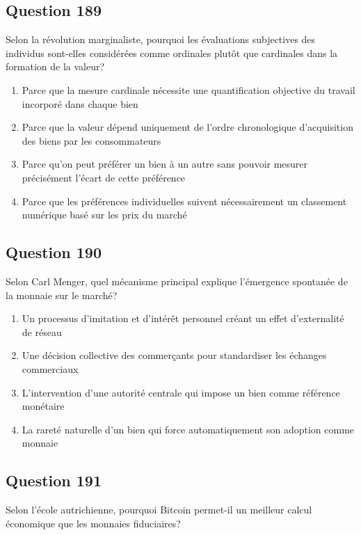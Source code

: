 \documentclass[12pt,a4paper]{article}
\begin{document}
\bigskip


\subsection*{Question 189}
Selon la révolution marginaliste, pourquoi les évaluations subjectives des individus sont-elles considérées comme ordinales plutôt que cardinales dans la formation de la valeur?

\begin{enumerate}[label=\Alph*., leftmargin=*]
\item Parce que la mesure cardinale nécessite une quantification objective du travail incorporé dans chaque bien
\item Parce que la valeur dépend uniquement de l'ordre chronologique d'acquisition des biens par les consommateurs
\item Parce qu'on peut préférer un bien à un autre sans pouvoir mesurer précisément l'écart de cette préférence
\item Parce que les préférences individuelles suivent nécessairement un classement numérique basé sur les prix du marché
\end{enumerate}

\bigskip


\subsection*{Question 190}
Selon Carl Menger, quel mécanisme principal explique l'émergence spontanée de la monnaie sur le marché?

\begin{enumerate}[label=\Alph*., leftmargin=*]
\item Un processus d'imitation et d'intérêt personnel créant un effet d'externalité de réseau
\item Une décision collective des commerçants pour standardiser les échanges commerciaux
\item L'intervention d'une autorité centrale qui impose un bien comme référence monétaire
\item La rareté naturelle d'un bien qui force automatiquement son adoption comme monnaie
\end{enumerate}

\bigskip


\subsection*{Question 191}
Selon l'école autrichienne, pourquoi Bitcoin permet-il un meilleur calcul économique que les monnaies fiduciaires?
\end{document}
